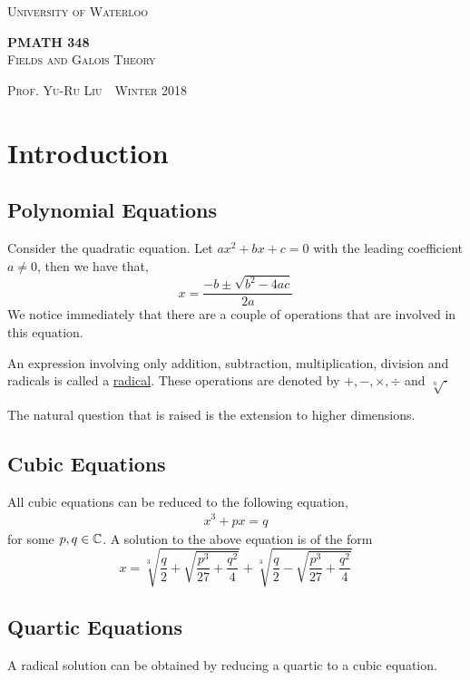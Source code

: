 \documentclass[11pt]{article}
\newcommand{\thiscoursecode}{PMATH 348}
\newcommand{\thiscoursename}{Fields and Galois Theory}
\newcommand{\thisprof}{Yu-Ru Liu}
\newcommand{\thisterm}{Winter 2018}
\begin{document}
\begin{titlepage}
\begin{centering}
{\scshape\LARGE University of Waterloo \par}
\globe
{\huge\bf \thiscoursecode}\\
{\scshape\Large \thiscoursename}\\
\vspace{.3cm}
{\scshape Prof. \thisprof~\textbullet~\thisterm\par}
\end{centering}
\sectionline
\tableofcontents
\sectionline
\thispagestyle{empty}
\end{titlepage}

\section{Introduction}
\subsection{Polynomial Equations}
Consider the quadratic equation. Let $ax^2 + bx + c = 0$ with the leading
coefficient $a \neq 0$, then we have that,
\begin{equation*}
x = \frac{-b \pm \sqrt{b^2 - 4ac}}{2a}
\end{equation*}
We notice immediately that there are a couple of operations that are involved in
this equation.
\begin{definition}
An expression involving only addition, subtraction, multiplication, division and
radicals is called a \underline{radical}. These operations are denoted by $+, -,
\times, \div$ and $\sqrt[n]{\cdot}$
\end{definition}
The natural question that is raised is the extension to higher dimensions.
\subsection{Cubic Equations}
All cubic equations can be reduced to the following equation,
\begin{align*}
x^3 + px = q
\end{align*}
for some $p, q \in \mathbb{C}$. A solution to the above equation is of the form
\begin{equation*}
x = \sqrt[3]{\frac{q}{2} + \sqrt{\frac{p^3}{27} + \frac{q^2}{4}}} +
\sqrt[3]{\frac{q}{2} - \sqrt{\frac{p^3}{27} + \frac{q^2}{4}}}\tag{Cardano's
Formula}
\end{equation*}
\subsection{Quartic Equations}
A radical solution can be obtained by reducing a quartic to a cubic equation.
\end{document}
